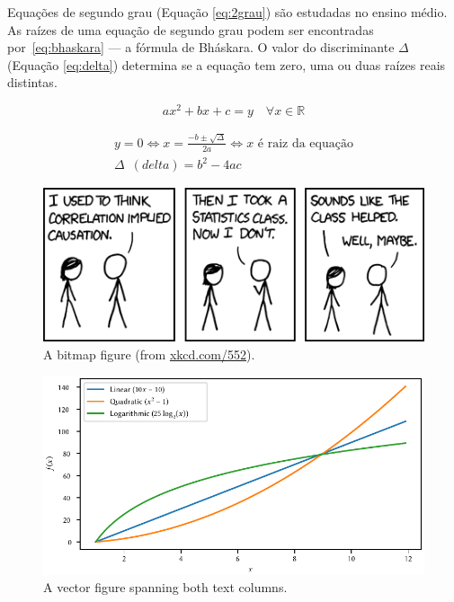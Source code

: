 \documentclass[portuguese,notblind]{sbc20}
\begin{document}
Equações de segundo grau (Equação \ref{eq:2grau}) são estudadas no ensino
médio. As raízes de uma equação de segundo grau podem ser encontradas
por~\eqref{eq:bhaskara} --- a fórmula de Bháskara. O valor do discriminante
$\Delta$ (Equação \ref{eq:delta}) determina se a equação tem zero, uma ou
duas raízes reais distintas.

\begin{equation}
  \label{eq:2grau}
  ax^2+bx+c=y \quad \forall x \in \mathbb{R}
\end{equation}

\begin{gather}
  \label{eq:bhaskara}
    y=0 \Leftrightarrow x=\frac{-b \pm \sqrt{\Delta}}{2a}
    \Leftrightarrow x \text{ é raiz da equação}\\
  \label{eq:delta}
    \Delta\enspace(\mathit{delta}) = b^2-4ac
\end{gather}

\begin{figure}
  \centering
  \includegraphics[width=\columnwidth]{figures/xkcd_552_correlation}
   \caption{A bitmap figure (from \url{xkcd.com/552}).\label{fig:xkcd-correlation}}
\end{figure}

\begin{figure}[b]
  \centering
  \includegraphics{figures/graph-functions}
  \caption{A vector figure spanning both text columns.\label{fig:graph-functions}}
\end{figure}
\end{document}
